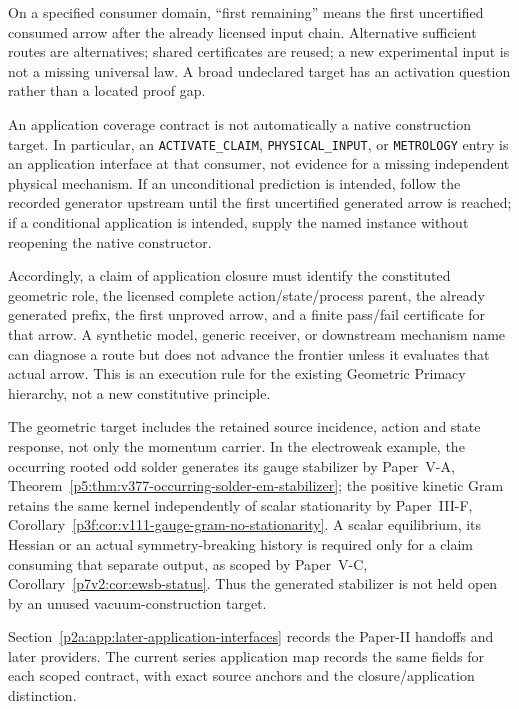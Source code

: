\documentclass[12pt,a4paper]{article}
\begin{document}
On a specified consumer domain, ``first remaining'' means the first
uncertified consumed arrow after the already licensed input chain.
Alternative sufficient routes are alternatives; shared certificates are
reused; a new experimental input is not a missing universal law. A broad
undeclared target has an activation question rather than a located proof
gap.

An application coverage contract is not automatically a
native construction target.  In particular, an \texttt{ACTIVATE\_CLAIM},
\texttt{PHYSICAL\_INPUT}, or \texttt{METROLOGY} entry is an application
interface at that consumer, not evidence for a missing independent physical
mechanism.  If an unconditional prediction is intended, follow the recorded
generator upstream until the first uncertified generated arrow is reached;
if a conditional application is intended, supply the named instance without
reopening the native constructor.

Accordingly, a claim of application closure must identify the constituted
geometric role, the licensed complete action/state/process parent, the already
generated prefix, the first unproved arrow, and a finite pass/fail certificate
for that arrow.  A synthetic model, generic receiver, or downstream mechanism
name can diagnose a route but does not advance the frontier unless it evaluates
that actual arrow.  This is an execution rule for the existing Geometric
Primacy hierarchy, not a new constitutive principle.

The geometric target includes the retained source incidence, action and
state response, not only the momentum carrier.  In the electroweak example,
the occurring rooted odd solder generates its gauge stabilizer by
Paper~V-A, Theorem~\ref{p5:thm:v377-occurring-solder-em-stabilizer};
the positive kinetic Gram retains the same kernel independently of scalar
stationarity by Paper~III-F,
Corollary~\ref{p3f:cor:v111-gauge-gram-no-stationarity}.  A scalar equilibrium,
its Hessian or an actual symmetry-breaking history is required only for a
claim consuming that separate output, as scoped by Paper~V-C,
Corollary~\ref{p7v2:cor:ewsb-status}.  Thus the generated stabilizer is not
held open by an unused vacuum-construction target.

Section~\ref{p2a:app:later-application-interfaces} records the Paper-II
handoffs and later providers. The current series application map records the
same fields for each scoped contract, with exact source anchors and the
closure/application distinction.
\end{document}
